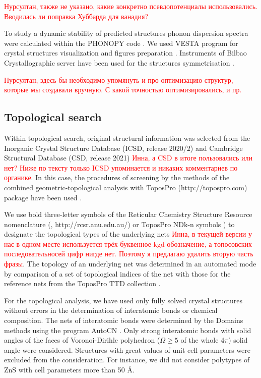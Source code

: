 \documentclass[a4paperm]{article}
\begin{document}
\textcolor{red}{Нурсултан, также не указано, какие конкретно псевдопотенциалы использовались. Вводилась ли поправка Хуббарда для ванадия?}

To study a dynamic stability of predicted structures phonon dispersion spectra were calculated within the PHONOPY code \cite{phonopy}. 
We used VESTA program for crystal structures visualization and figures preparation \cite{momma2011vesta}.
Instruments of Bilbao Crystallographic server have been used for the structures symmetrisation \cite{bilbao}.

\textcolor{red}{Нурсултан, здесь бы необходимо упомянуть и про оптимизацию структур, которые мы создавали вручную. С какой точностью оптимизировались, и пр.}



\subsection*{Topological search}

Within topological search, original structural information was selected from the Inorganic Crystal Structure Database (ICSD, release 2020/2) \cite{icsd_1} and Cambridge Structural Database (CSD, release 2021) \cite{icsd_2} 
\textcolor{red}{Инна, а CSD в итоге пользовались или нет? Ниже по тексту только ICSD упоминается и никаких комментариев по органике}.
In this case, the procedures of screening  by the methods of the combined geometric-topological analysis with ToposPro (http://topospro.com) package have been used \cite{topos_1}. 

We use bold three-letter symbols of the Reticular Chemistry Structure Resource nomenclature (\cite{rcsr}, http://rcsr.anu.edu.au/) or ToposPro NDk-n symbols \cite{rcsr_2}) to designate the topological types of the underlying nets
\textcolor{red}{Инна, в текущей версии у нас в одном месте используется трёх-буквенное kgd-обозначение, а топосовских последовательносей цифр нигде нет. Поэтому я предлагаю удалить вторую часть фразы}.
The topology of an underlying net was determined in an automated mode by comparison of a set of topological indices of the net with those for the reference nets from the ToposPro TTD collection \cite{TTD}.

For the topological analysis, we have used only fully solved crystal structures without errors in the determination of interatomic bonds or chemical composition.
The nets of interatomic bonds were determined by the Domains methods using the program AutoCN \cite{blatov2016_rods}. 
Only strong interatomic bonds with solid angles of the faces of Voronoi-Dirihle polyhedron ($\Omega \geq 5 $ of the whole 4$\pi$) solid angle were considered.
Structures with great values of unit cell parameters were excluded from the consideration.
For instance, we did not consider polytypes of ZnS with cell parameters more than 50 \AA.
\end{document}
